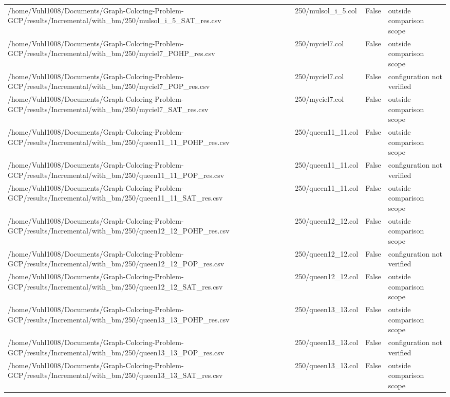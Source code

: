 \begin{table}[htbp]
\begin{tabular}{llll}
/home/Vuhl1008/Documents/Graph-Coloring-Problem-GCP/results/Incremental/with\_bm/250/mulsol\_i\_5\_SAT\_res.csv & 250/mulsol\_i\_5.col & False & outside comparison scope \\
/home/Vuhl1008/Documents/Graph-Coloring-Problem-GCP/results/Incremental/with\_bm/250/myciel7\_POHP\_res.csv & 250/myciel7.col & False & outside comparison scope \\
/home/Vuhl1008/Documents/Graph-Coloring-Problem-GCP/results/Incremental/with\_bm/250/myciel7\_POP\_res.csv & 250/myciel7.col & False & configuration not verified \\
/home/Vuhl1008/Documents/Graph-Coloring-Problem-GCP/results/Incremental/with\_bm/250/myciel7\_SAT\_res.csv & 250/myciel7.col & False & outside comparison scope \\
/home/Vuhl1008/Documents/Graph-Coloring-Problem-GCP/results/Incremental/with\_bm/250/queen11\_11\_POHP\_res.csv & 250/queen11\_11.col & False & outside comparison scope \\
/home/Vuhl1008/Documents/Graph-Coloring-Problem-GCP/results/Incremental/with\_bm/250/queen11\_11\_POP\_res.csv & 250/queen11\_11.col & False & configuration not verified \\
/home/Vuhl1008/Documents/Graph-Coloring-Problem-GCP/results/Incremental/with\_bm/250/queen11\_11\_SAT\_res.csv & 250/queen11\_11.col & False & outside comparison scope \\
/home/Vuhl1008/Documents/Graph-Coloring-Problem-GCP/results/Incremental/with\_bm/250/queen12\_12\_POHP\_res.csv & 250/queen12\_12.col & False & outside comparison scope \\
/home/Vuhl1008/Documents/Graph-Coloring-Problem-GCP/results/Incremental/with\_bm/250/queen12\_12\_POP\_res.csv & 250/queen12\_12.col & False & configuration not verified \\
/home/Vuhl1008/Documents/Graph-Coloring-Problem-GCP/results/Incremental/with\_bm/250/queen12\_12\_SAT\_res.csv & 250/queen12\_12.col & False & outside comparison scope \\
/home/Vuhl1008/Documents/Graph-Coloring-Problem-GCP/results/Incremental/with\_bm/250/queen13\_13\_POHP\_res.csv & 250/queen13\_13.col & False & outside comparison scope \\
/home/Vuhl1008/Documents/Graph-Coloring-Problem-GCP/results/Incremental/with\_bm/250/queen13\_13\_POP\_res.csv & 250/queen13\_13.col & False & configuration not verified \\
/home/Vuhl1008/Documents/Graph-Coloring-Problem-GCP/results/Incremental/with\_bm/250/queen13\_13\_SAT\_res.csv & 250/queen13\_13.col & False & outside comparison scope \\

\end{tabular}
\end{table}
